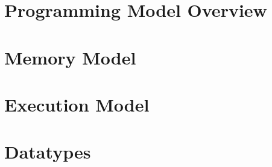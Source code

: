 \documentclass[10pt]{book}
\begin{document}





%

\section{Programming Model Overview}\label{subsec:programming_model}


\section{Memory Model}\label{subsec:memory_model}


\section{Execution Model}\label{subsec:execution_model}


\section{Datatypes}\label{subsec:datatypes}


%

%

%




\clearpage
\end{document}
